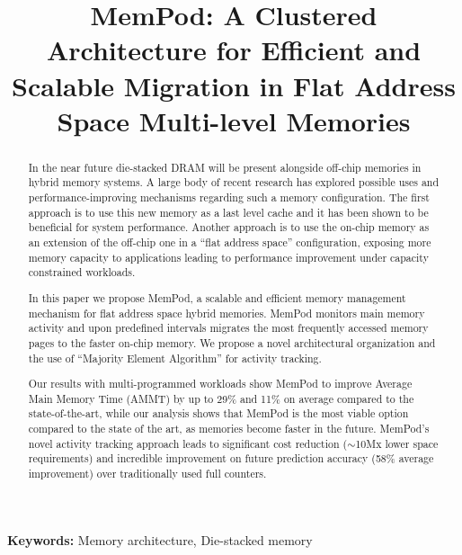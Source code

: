 \documentclass{sig-alternate}
\title {MemPod: A Clustered Architecture for Efficient and Scalable Migration in Flat Address Space Multi-level Memories}
\author{}
\begin{document}
\maketitle
\thispagestyle{firstpage}
\pagestyle{plain}

\begin{abstract}

In the near future die-stacked DRAM will be present alongside off-chip memories in hybrid memory systems. A large body of recent research has explored possible uses and performance-improving mechanisms regarding such a memory configuration. The first approach is to use this new memory as a last level cache and it has been shown to be beneficial for system performance. Another approach is to use the on-chip memory as an extension of the off-chip one in a ``flat address space'' configuration, exposing more memory capacity to applications leading to performance improvement under capacity constrained workloads.

In this paper we propose MemPod, a scalable and efficient memory management mechanism for flat address space hybrid memories. MemPod monitors main memory activity and upon predefined intervals migrates the most frequently accessed memory pages to the faster on-chip memory. We propose a novel architectural organization and the use of ``Majority Element Algorithm'' for activity tracking. 

Our results with multi-programmed workloads show MemPod to improve Average Main Memory Time (AMMT) by up to 29\% and 11\% on average compared to the state-of-the-art, while our analysis shows that MemPod is the most viable option compared to the state of the art, as memories become faster in the future. MemPod's novel activity tracking approach leads to significant cost reduction ($\sim$10Mx lower space requirements) and incredible improvement on future prediction accuracy (58\% average improvement) over traditionally used full counters. 

\end{abstract}

\noindent \textbf{Keywords:} Memory architecture, Die-stacked memory



%







\end{document}
